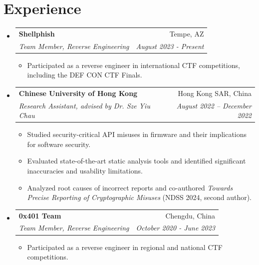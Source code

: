 \documentclass[letterpaper,11pt]{article}
\makeatletter
\newcommand{\resumeItem}[1]{
  \item\small{
    {#1 \vspace{-2pt}}
  }
}
\newcommand{\resumeSubheading}[4]{
  \vspace{-1pt}\item
    \begin{tabular*}{0.97\textwidth}[t]{l@{\extracolsep{\fill}}r}
      \textbf{#1} & #2 \\
      \textit{\small#3} & \textit{\small #4} \\
    \end{tabular*}\vspace{-5pt}
}
\newcommand{\resumeSubSubheading}[2]{
    \begin{tabular*}{0.97\textwidth}{l@{\extracolsep{\fill}}r}
      \textit{\small#1} & \textit{\small #2} \\
    \end{tabular*}\vspace{-5pt}
}
\newcommand{\resumeSubHeadingListStart}{\begin{itemize}[leftmargin=*]}
\newcommand{\resumeSubHeadingListEnd}{\end{itemize}}
\newcommand{\resumeItemListStart}{\begin{itemize}}
\newcommand{\resumeItemListEnd}{\end{itemize}\vspace{-5pt}}
\makeatother
\begin{document}
\section{Experience}
 \resumeSubHeadingListStart
\resumeSubheading
  {Shellphish}{Tempe, AZ}
  {Team Member, Reverse Engineering}{August 2023 - Present}
    \resumeItemListStart
      \resumeItem{Participated as a reverse engineer in international CTF competitions, including the DEF CON CTF Finals.}
    \resumeItemListEnd
\resumeSubheading
  {Chinese University of Hong Kong}{Hong Kong SAR, China}
  {Research Assistant, advised by Dr. Sze Yiu Chau}{August 2022 -- December 2022}
  \resumeItemListStart
    \resumeItem{Studied security-critical API misuses in firmware and their implications for software security.}
    \resumeItem{Evaluated state-of-the-art static analysis tools and identified significant inaccuracies and usability limitations.}
    \resumeItem{Analyzed root causes of incorrect reports and co-authored \textit{Towards Precise Reporting of Cryptographic Misuses} (NDSS 2024, second author).}
  \resumeItemListEnd
 \resumeSubheading
      {0x401 Team}{Chengdu, China}
      {Team Member, Reverse Engineering} {October 2020 - June 2023}
      \resumeItemListStart
        \resumeItem{Participated as a reverse engineer in regional and national CTF competitions.}
      \resumeItemListEnd
  \resumeSubHeadingListEnd




\end{document}
